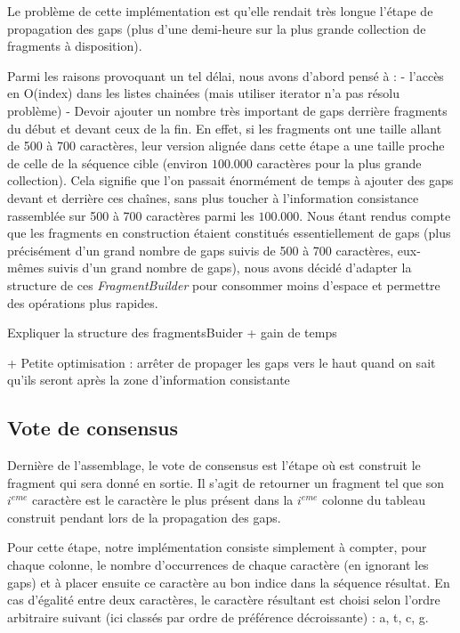 \documentclass{article}
\begin{document}
Le problème de cette implémentation est qu'elle rendait très longue l'étape de propagation des gaps (plus d'une demi-heure sur la plus grande collection de fragments à disposition). 

Parmi les raisons provoquant un tel délai, nous avons d'abord pensé à :
- l'accès en O(index) dans les listes chainées (mais utiliser iterator n'a pas résolu problème)
- Devoir ajouter un nombre très important de gaps derrière fragments du début et devant ceux de la fin. En effet, si les fragments ont une taille allant de 500 à 700 caractères, leur version alignée dans cette étape a une taille proche de celle de la séquence cible (environ $100.000$ caractères pour la plus grande collection). Cela signifie que l'on passait énormément de temps à ajouter des gaps devant et derrière ces chaînes, sans plus toucher à l'information consistance rassemblée sur 500 à 700 caractères parmi les $100.000$.
Nous étant rendus compte que les fragments en construction étaient constitués essentiellement de gaps (plus précisément d'un grand nombre de gaps suivis de 500 à 700 caractères, eux-mêmes suivis d'un grand nombre de gaps), nous avons décidé d'adapter la structure de ces \textit{FragmentBuilder} pour consommer moins d'espace et permettre des opérations plus rapides.

Expliquer la structure des fragmentsBuider + gain de temps

+ Petite optimisation : arrêter de propager les gaps vers le haut quand on sait qu'ils seront après la zone d'information consistante


\subsection{Vote de consensus}

Dernière de l'assemblage, le vote de consensus est l'étape où est construit le fragment qui sera donné en sortie. Il s'agit de retourner un fragment tel que son $i^{eme}$ caractère est le caractère le plus présent dans la $i^{eme}$ colonne du tableau construit pendant lors de la propagation des gaps.

Pour cette étape, notre implémentation consiste simplement à compter, pour chaque colonne, le nombre d’occurrences de chaque caractère (en ignorant les gaps) et à placer ensuite ce caractère au bon indice dans la séquence résultat.
En cas d'égalité entre deux caractères, le caractère résultant est choisi selon l'ordre arbitraire suivant (ici classés par ordre de préférence décroissante) : a, t, c, g.
\end{document}
